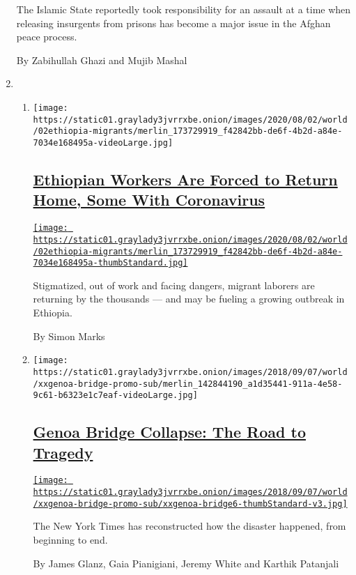 \begin{enumerate}
  The Islamic State reportedly took responsibility for an assault at a
  time when releasing insurgents from prisons has become a major issue
  in the Afghan peace process.

  By Zabihullah Ghazi and Mujib Mashal
\item
  \begin{enumerate}
  \def\labelenumii{\arabic{enumii}.}
  \item
    \texttt{[image: https://static01.graylady3jvrrxbe.onion/images/2020/08/02/world/02ethiopia-migrants/merlin\_173729919\_f42842bb-de6f-4b2d-a84e-7034e168495a-videoLarge.jpg]}

    \hypertarget{ethiopian-workers-are-forced-to-return-home-some-with-coronavirus}{%
    \subsection{\texorpdfstring{\href{/2020/08/01/world/africa/ethiopian-migrant-workers-coronavirus.html}{Ethiopian
    Workers Are Forced to Return Home, Some With
    Coronavirus}}{Ethiopian Workers Are Forced to Return Home, Some With Coronavirus}}\label{ethiopian-workers-are-forced-to-return-home-some-with-coronavirus}}

    \href{/2020/08/01/world/africa/ethiopian-migrant-workers-coronavirus.html}{\texttt{[image: https://static01.graylady3jvrrxbe.onion/images/2020/08/02/world/02ethiopia-migrants/merlin\_173729919\_f42842bb-de6f-4b2d-a84e-7034e168495a-thumbStandard.jpg]}}

    Stigmatized, out of work and facing dangers, migrant laborers are
    returning by the thousands --- and may be fueling a growing outbreak
    in Ethiopia.

    By Simon Marks
  \item
    \texttt{[image: https://static01.graylady3jvrrxbe.onion/images/2018/09/07/world/xxgenoa-bridge-promo-sub/merlin\_142844190\_a1d35441-911a-4e58-9c61-b6323e1c7eaf-videoLarge.jpg]}

    \hypertarget{genoa-bridge-collapse-the-road-to-tragedy}{%
    \subsection{\texorpdfstring{\href{/interactive/2018/09/06/world/europe/genoa-italy-bridge.html}{Genoa
    Bridge Collapse: The Road to
    Tragedy}}{Genoa Bridge Collapse: The Road to Tragedy}}\label{genoa-bridge-collapse-the-road-to-tragedy}}

    \href{/interactive/2018/09/06/world/europe/genoa-italy-bridge.html}{\texttt{[image: https://static01.graylady3jvrrxbe.onion/images/2018/09/07/world/xxgenoa-bridge-promo-sub/xxgenoa-bridge6-thumbStandard-v3.jpg]}}

    The New York Times has reconstructed how the disaster happened, from
    beginning to end.

    By James Glanz, Gaia Pianigiani, Jeremy White and Karthik Patanjali
  \end{enumerate}
\end{enumerate}

